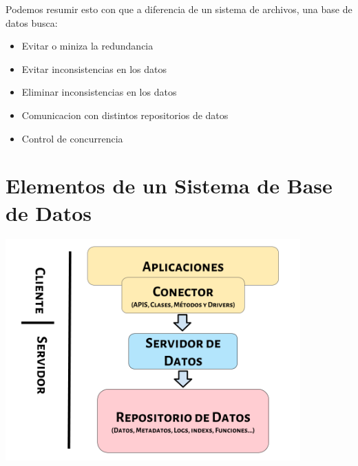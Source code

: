 \documentclass[12pt, fleqn]{report}                             %
\begin{document}
            Podemos resumir esto con que a diferencia de un sistema de archivos, una base de datos                busca:
            \begin{itemize}
                \item Evitar o miniza la redundancia
                \item Evitar inconsistencias en los datos
                \item Eliminar inconsistencias en los datos
                \item Comunicacion con distintos repositorios de datos
                \item Control de concurrencia
            \end{itemize}




        \clearpage
        \section{Elementos de un Sistema de Base de Datos}

            \includegraphics[width=0.85\textwidth]{DiagramaPartes.png}
\end{document}
